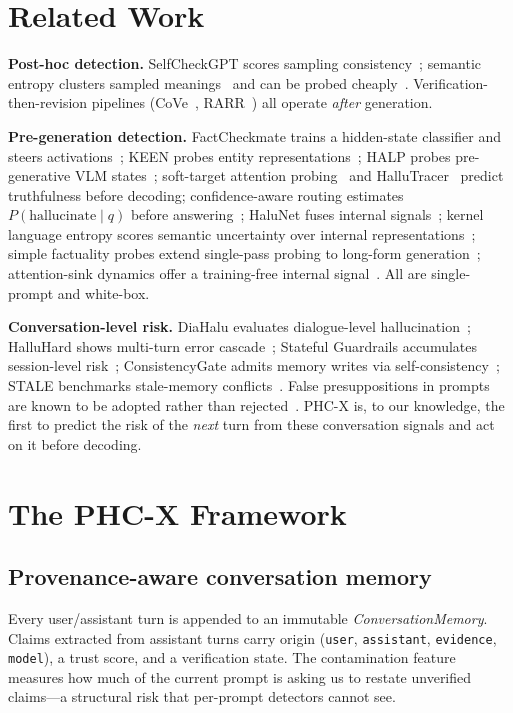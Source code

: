 \documentclass[10pt]{article}
\begin{document}
\section{Related Work}
\textbf{Post-hoc detection.} SelfCheckGPT scores sampling
consistency~\cite{selfcheckgpt}; semantic entropy clusters sampled
meanings~\cite{kuhn2023} and can be probed cheaply~\cite{semanticentropyp}.
Verification-then-revision pipelines (CoVe~\cite{cove},
RARR~\cite{rarr}) all operate \emph{after} generation.

\textbf{Pre-generation detection.} FactCheckmate trains a hidden-state
classifier and steers activations~\cite{factcheckmate}; KEEN probes entity
representations~\cite{keen}; HALP probes pre-generative VLM
states~\cite{halp}; soft-target attention probing~\cite{miftakhova2026}
and HalluTracer~\cite{hallutracer} predict truthfulness before decoding;
confidence-aware routing estimates $P(\text{hallucinate}\mid q)$ before
answering~\cite{nandakishor2025}; HaluNet fuses internal
signals~\cite{halunet}; kernel language entropy scores semantic
uncertainty over internal representations~\cite{kernelformula}; simple
factuality probes extend single-pass probing to long-form
generation~\cite{han2025}; attention-sink dynamics offer a training-free
internal signal~\cite{binkowski2026}. All are single-prompt and
white-box.

\textbf{Conversation-level risk.} DiaHalu evaluates dialogue-level
hallucination~\cite{dihalu}; HalluHard shows multi-turn error
cascade~\cite{halluhard}; Stateful Guardrails accumulates session-level
risk~\cite{statefulguardrails}; ConsistencyGate admits memory writes via
self-consistency~\cite{consistencygate}; STALE benchmarks stale-memory
conflicts~\cite{stale}. False presuppositions in prompts are known to be
adopted rather than rejected~\cite{sieker2025}. PHC-X is, to our knowledge,
the first to predict the risk of the \emph{next} turn from these
conversation signals and act on it before decoding.

\section{The PHC-X Framework}
\subsection{Provenance-aware conversation memory}
Every user/assistant turn is appended to an immutable
\emph{ConversationMemory}. Claims extracted from assistant turns carry
origin (\texttt{user}, \texttt{assistant}, \texttt{evidence}, \texttt{model}),
a trust score, and a verification state. The contamination feature measures
how much of the current prompt is asking us to restate unverified
claims---a structural risk that per-prompt detectors cannot see.
\end{document}
